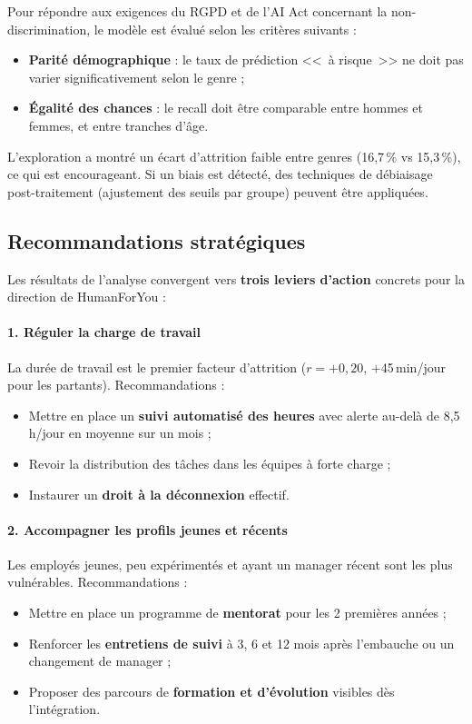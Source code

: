 Pour répondre aux exigences du RGPD et de l'AI Act concernant la non-discrimination, le modèle est évalué selon les critères suivants :
\begin{itemize}
    \item \textbf{Parité démographique} : le taux de prédiction <<~à risque~>> ne doit pas varier significativement selon le genre ;
    \item \textbf{Égalité des chances} : le recall doit être comparable entre hommes et femmes, et entre tranches d'âge.
\end{itemize}
L'exploration a montré un écart d'attrition faible entre genres (16,7\,\% vs 15,3\,\%), ce qui est encourageant. Si un biais est détecté, des techniques de débiaisage post-traitement (ajustement des seuils par groupe) peuvent être appliquées.

\subsection{Recommandations stratégiques}

Les résultats de l'analyse convergent vers \textbf{trois leviers d'action} concrets pour la direction de HumanForYou :

\paragraph{1. Réguler la charge de travail}
La durée de travail est le premier facteur d'attrition ($r = +0,20$, $+$45\,min/jour pour les partants). Recommandations :
\begin{itemize}
    \item Mettre en place un \textbf{suivi automatisé des heures} avec alerte au-delà de 8,5\,h/jour en moyenne sur un mois ;
    \item Revoir la distribution des tâches dans les équipes à forte charge ;
    \item Instaurer un \textbf{droit à la déconnexion} effectif.
\end{itemize}

\paragraph{2. Accompagner les profils jeunes et récents}
Les employés jeunes, peu expérimentés et ayant un manager récent sont les plus vulnérables. Recommandations :
\begin{itemize}
    \item Mettre en place un programme de \textbf{mentorat} pour les 2 premières années ;
    \item Renforcer les \textbf{entretiens de suivi} à 3, 6 et 12 mois après l'embauche ou un changement de manager ;
    \item Proposer des parcours de \textbf{formation et d'évolution} visibles dès l'intégration.
\end{itemize}

